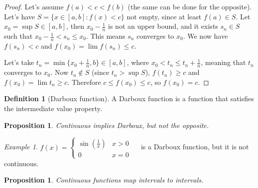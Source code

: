 \documentclass{article}
\newcommand{\fr}[2]{\frac{#1}{#2}}
\newcommand{\intcc}[1]{\left[#1\right]}
\theoremstyle{definition}
\newtheorem{definition}{Definition}[section]
\theoremstyle{definition}
\theoremstyle{plain}
\theoremstyle{plain}
\theoremstyle{plain}
\theoremstyle{plain}
\newtheorem{proposition}[theorem]{Proposition}
\theoremstyle{definition}
\theoremstyle{remark}
\theoremstyle{remark}
\theoremstyle{remark}
\newtheorem{examplet}{Example}[theorem]
\theoremstyle{remark}
\begin{document}
\begin{proof}
  Let's assume $f(a) < c < f(b)$ (the same can be done for the opposite). Let's have $S = \{ x \in \intcc{a,b} : f(x) < c \}$ not empty, since at least $f(a) \in S$. Let $x_0 = \sup S \in \intcc{a,b}$, then $x_0 - \frac{1}{n}$ is not an upper bound, and it exists $s_n \in S$ such that $x_0 - \frac{1}{n} < s_n \leq x_0$. This means $s_n$ converges to $x_0$. We now have $f(s_n) < c$ and $f(x_0) = \lim f(s_n) \leq c$.
  
  Let's take $t_n = \min \{ x_0 + \fr{1}{n}, b \} \in \intcc{a,b}$, where $x_0 < t_n \leq t_n + \fr{1}{n}$, meaning that $t_n$ converges to $x_0$. Now $t_n \notin S$ (since $t_n > \sup S$), $f(t_n) \geq c$ and $f(x_0) = \lim t_n \geq c$. Therefore $c \leq f(x_0) \leq c$, so $f(x_0) = c$.
\end{proof}


\begin{definition}[Darboux function]
  A Darboux function is a function that satisfies the intermediate value property.
\end{definition}


\begin{proposition}
  Continuous implies Darboux, but not the opposite.
\end{proposition}

\begin{examplet}
  $f(x) = \begin{cases}\sin(\frac{1}{x}) & x > 0 \\ 0 & x = 0\end{cases} \quad$ is a Darboux function, but it is not continuous.
\end{examplet}


\begin{proposition}
  Continuous functions map intervals to intervals.
\end{proposition}
\end{document}
